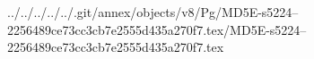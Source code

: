 ../../../../../.git/annex/objects/v8/Pg/MD5E-s5224--2256489ce73cc3cb7e2555d435a270f7.tex/MD5E-s5224--2256489ce73cc3cb7e2555d435a270f7.tex